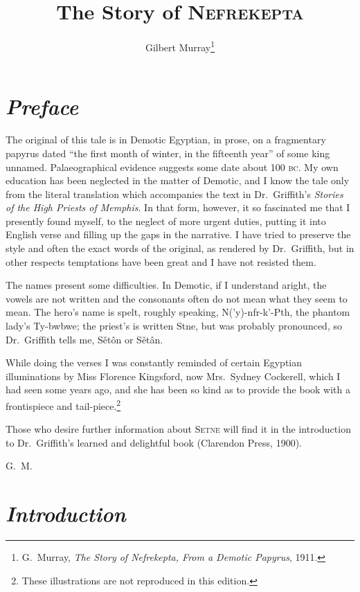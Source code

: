 \documentclass[12pt]{article}
\title{\Huge\swshape The Story of \textsc{Nefrekepta}}
\author{Gilbert Murray\footnote{G.~Murray, \textit{The Story of Nefrekepta,
From a Demotic Papyrus}, 1911.}}
\date{}
\begin{document}
\maketitle


\section*{\mdseries\itshape Preface}

The original of this tale is in Demotic Egyptian, in prose, on a fragmentary
papyrus dated ``the first month of winter, in the fifteenth year'' of some king
unnamed. Palaeographical evidence suggests some date about 100 \textsc{bc}. My
own education has been neglected in the matter of Demotic, and I know the tale
only from the literal translation which accompanies the text in Dr.~Griffith's
\textit{Stories of the High Priests of Memphis}. In that form, however, it so
fascinated me that I presently found myself, to the neglect of more urgent
duties, putting it into English verse and filling up the gaps in the narrative.
I have tried to preserve the style and often the exact words of the original,
as rendered by Dr.~Griffith, but in other respects temptations have been great
and I have not resisted them.

The names present some difficulties. In Demotic, if I understand aright, the
vowels are not written and the consonants often do not mean what they seem to
mean. The hero's name is spelt, roughly speaking, N('y)-nfr-k'-Pth, the phantom
lady's Ty-bwbwe; the priest's is written Stne, but was probably pronounced, so
Dr.~Griffith tells me, S\v{e}t\^{o}n or S\v{e}t\^{a}n.

While doing the verses I was constantly reminded of certain Egyptian
illuminations by Miss Florence Kingsford, now Mrs.~Sydney Cockerell, which I
had seen some years ago, and she has been so kind as to provide the book with a
frontispiece and tail-piece.\footnote{These illustrations are not reproduced in
this edition.}

Those who desire further information about \textsc{Setne} will find it in the
introduction to Dr.~Griffith's learned and delightful book (Clarendon Press,
1900).

\null\hfill G.~M.


\section*{\mdseries\itshape Introduction}
\end{document}
